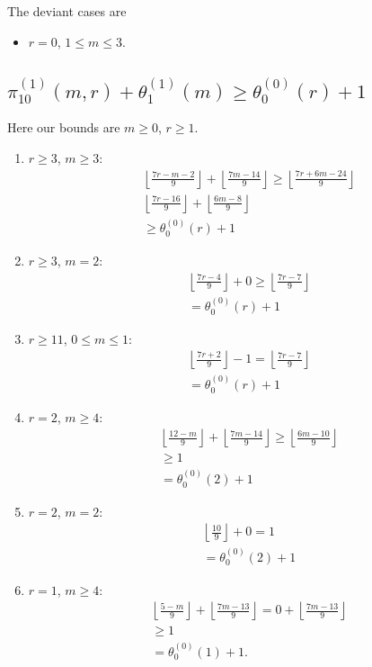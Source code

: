 \documentclass[reqno]{amsart}
\theoremstyle{definition}
\theoremstyle{remark}
\numberwithin{equation}{section}
\begin{document}
The deviant cases are

\begin{itemize}
\item $r=0$, $1\le m\le 3$.
\end{itemize}

\subsection{$\displaystyle{\pi^{(1)}_{10}(m,r)+\theta^{(1)}_1(m)\ge \theta^{(0)}_0(r)+1}$}\label{110bounds}

Here our bounds are $m\ge 0$, $r\ge 1$.\\

\begin{enumerate}
\item $r\ge 3$, $m\ge 3$:
\begin{align*}
&\left\lfloor \frac{7r-m-2}{9} \right\rfloor + \left\lfloor \frac{7m-14}{9} \right\rfloor\ge \left\lfloor \frac{7r+6m-24}{9} \right\rfloor \\
&\left\lfloor \frac{7r-16}{9} \right\rfloor + \left\lfloor \frac{6m-8}{9} \right\rfloor\\
&\ge\theta^{(0)}_0(r)+1
\end{align*}
\item $r\ge 3$, $m=2$:
\begin{align*}
&\left\lfloor \frac{7r-4}{9} \right\rfloor + 0\ge \left\lfloor \frac{7r-7}{9} \right\rfloor\\
&=\theta^{(0)}_0(r)+1
\end{align*}
\item $r\ge 11$, $0\le m\le 1$:
\begin{align*}
&\left\lfloor \frac{7r+2}{9} \right\rfloor - 1 = \left\lfloor \frac{7r-7}{9} \right\rfloor\\
&=\theta^{(0)}_0(r)+1
\end{align*}
\item $r=2$, $m\ge 4$:
\begin{align*}
&\left\lfloor \frac{12-m}{9} \right\rfloor + \left\lfloor \frac{7m-14}{9} \right\rfloor\ge \left\lfloor \frac{6m-10}{9} \right\rfloor \\
&\ge 1\\
&=\theta^{(0)}_0(2)+1
\end{align*}
\item $r=2$, $m=2$:
\begin{align*}
&\left\lfloor \frac{10}{9} \right\rfloor + 0= 1 \\
&=\theta^{(0)}_0(2)+1
\end{align*}
\item $r=1$, $m\ge 4$:
\begin{align*}
&\left\lfloor \frac{5-m}{9} \right\rfloor + \left\lfloor \frac{7m-13}{9} \right\rfloor= 0+ \left\lfloor \frac{7m-13}{9} \right\rfloor \\
&\ge 1\\
&=\theta^{(0)}_0(1)+1.
\end{align*}
\end{enumerate}
\end{document}
